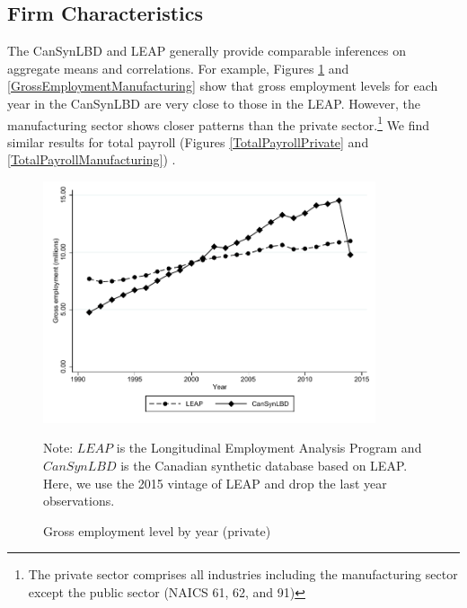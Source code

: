 
\newcommand{\TableNote}{$LEAP$ is the Longitudinal Employment Analysis Program and $CanSynLBD$ is the Canadian synthetic database based on LEAP. Here, we use the 2015 vintage of LEAP and drop the last year observations.}

\subsection{Firm Characteristics}

The CanSynLBD and LEAP generally provide comparable inferences on aggregate means and correlations. For example, Figures \ref{GrossEmploymentPrivate} and \ref{GrossEmploymentManufacturing} show that gross employment levels for each year in the CanSynLBD are very close to those in the LEAP. However, the manufacturing sector shows closer patterns than the private sector.\footnote{The private sector comprises all industries including the manufacturing sector except the public sector  (NAICS 61, 62, and 91)} We find similar results for total payroll (Figures \ref{TotalPayrollPrivate} and  \ref{TotalPayrollManufacturing}) .

 
\begin{figure} [H]
\centering
\caption{Gross employment level by year (private)} \label{GrossEmploymentPrivate}
\includegraphics[height=2.8in, width=.7\linewidth]{graphs/Gross_employment_level_by_year_private_bw.pdf} 
\begin{minipage}{0.85\textwidth}
{\footnotesize Note: \TableNote \par}
\end{minipage}
\end{figure}



